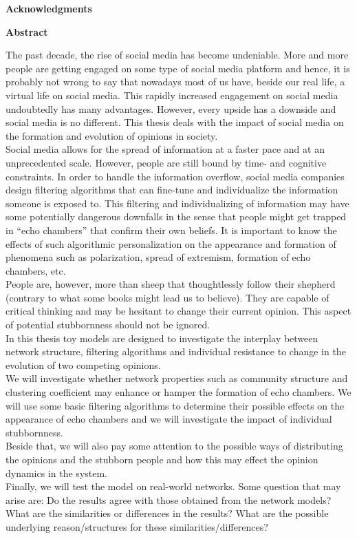 \documentclass[11 pt , letterpaper , twoside , openright]{book}
\newenvironment{abstract}%
{\cleardoublepage\null \vfill\begin{center}\bfseries \abstractname \end{center}}{\vfill\null}
\begin{document}
\pagestyle{plain}
\renewcommand{\abstractname}{Acknowledgments}
\begin{abstract}

\end{abstract}

\renewcommand{\abstractname}{Abstract}
\begin{abstract}
The past decade, the rise of social media has become undeniable. More and more people are getting engaged on some type of social media platform and hence, it is probably not wrong to say that nowadays most of us have, beside our real life, a virtual life on social media. This rapidly increased engagement on social media undoubtedly has many advantages. However, every upside has a downside and social media is no different. This thesis deals with the impact of social media on the formation and evolution of opinions in society.\\ 
Social media allows for the spread of information at a faster pace and at an unprecedented scale. However, people are still bound by time- and cognitive constraints. In order to handle the information overflow, social media companies design filtering algorithms that can fine-tune and individualize the information someone is exposed to. This filtering and individualizing of information may have some potentially dangerous downfalls in the sense that people might get trapped in ``echo chambers'' that confirm their own beliefs. It is important to know the effects of such algorithmic personalization on the appearance and formation of phenomena such as polarization, spread of extremism, formation of echo chambers, etc.\\
People are, however, more than sheep that thoughtlessly follow their shepherd (contrary to what some books might lead us to believe). They are capable of critical thinking and may be hesitant to change their current opinion. This aspect of potential stubbornness should not be ignored.\\
In this thesis toy models are designed to investigate the interplay between network structure, filtering algorithms and individual resistance to change in the evolution of two competing opinions.\\
We will investigate whether network properties such as community structure and clustering coefficient may enhance or hamper the formation of echo chambers. We will use some basic filtering algorithms to determine their possible effects on the appearance of echo chambers and we will investigate the impact of individual stubbornness. \\
Beside that, we will also pay some attention to the possible ways of distributing the opinions and the stubborn people and how this may effect the opinion dynamics in the system. \\
Finally, we will test the model on real-world networks. Some question that may arise are: Do the results agree with those obtained from the network models? What are the similarities or differences in the results? What are the possible underlying reason/structures for these similarities/differences?\\


\end{abstract}
\end{document}
